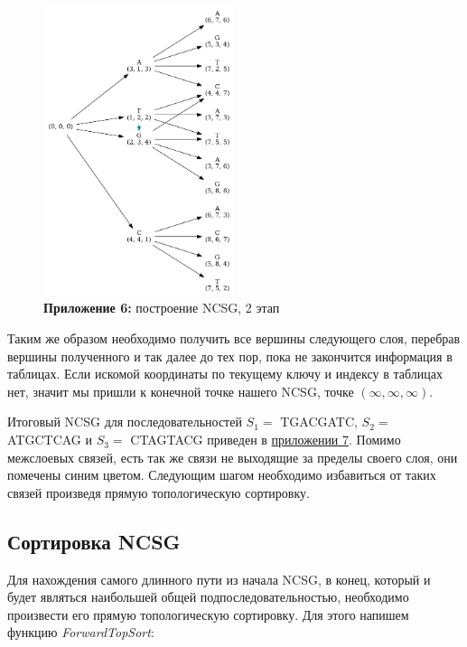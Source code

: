 \documentclass[a4paper,12pt]{extarticle}
\begin{document}
\begin{figure}
  \captionsetup{justification=centering}
  \caption*{\textbf{Приложение 6:} построение NCSG, 2 этап}
  \label{ncsg:2}
  \includegraphics[width=0.5\textwidth]{Graph_5.png}
\end{figure}

Таким же образом необходимо получить все вершины следующего слоя, перебрав вершины полученного и так далее до тех пор, пока не закончится информация в таблицах. Если искомой координаты по текущему ключу и индексу в таблицах нет, значит мы пришли к конечной точке нашего NCSG, точке $(\infty, \infty, \infty)$.

Итоговый NCSG для последовательностей $S_{1} =$ TGACGATC, $S_{2} =$ ATGCTCAG и $S_{3} =$ CTAGTACG приведен в \hyperref[ncsg:3]{приложении 7}. Помимо межслоевых связей, есть так же связи не выходящие за пределы своего слоя, они помечены синим цветом. Следующим шагом необходимо избавиться от таких связей произведя прямую топологическую сортировку.

\subsection{Сортировка NCSG}

Для нахождения самого длинного пути из начала NCSG, в конец, который и будет являться наибольшей общей подпоследовательностью, необходимо произвести его прямую топологическую сортировку. Для этого напишем функцию \textit{ForwardTopSort}:
\end{document}
